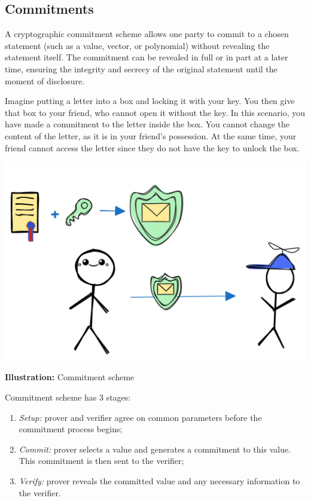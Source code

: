 \documentclass[../lecture-notes.tex]{subfiles}
\begin{document}
\subsection{Commitments}

\begin{definition}
    A cryptographic commitment scheme allows one party to commit to a chosen statement (such as a value, vector, or polynomial) without revealing the statement itself. The commitment can be revealed in full or in part at a later time, ensuring the integrity and secrecy of the original statement until the moment of disclosure.
\end{definition}

Imagine putting a letter into a box and locking it with your key. 
You then give that box to your friend, who cannot open it without the key.
In this scenario, you have made a commitment to the letter inside the box. 
You cannot change the content of the letter, as it is in your friend's possession. 
At the same time, your friend cannot access the letter since they do not have the key to unlock the box.

\begin{center}
    \centering\includegraphics[width=0.5\linewidth, clip]{images/lecture_5/CommitmentExample.png}

    \scriptsize{\textbf{Illustration:} Commitment scheme}
\end{center}

Commitment scheme has 3 stages:
\begin{enumerate}
    \item \textit{Setup:}  prover and verifier agree on common parameters before the commitment process begins;

    \item \textit{Commit:} prover selects a value and generates a commitment to this value. This commitment is then sent to the verifier;

    \item  \textit{Verify:} prover reveals the committed value and any necessary information to the verifier. 
\end{enumerate}
\end{document}
